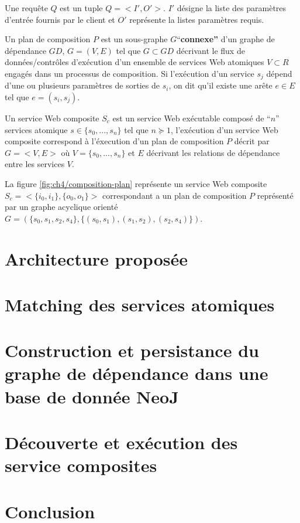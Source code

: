  \newpage
  \begin{mydef} Une requête $Q$ est un tuple $Q =
    <I', O'>$. $I'$ désigne la liste des paramètres d'entrée fournis
    par le client et $O'$ représente la listes paramètres requis.
  \end{mydef}

  \begin{mydef} Un plan de composition
    $P$ est un sous-graphe $G$``\textbf{connexe''} d'un graphe de
    dépendance $GD$, $G=(V,E)$ tel que $G \subset GD$ décrivant le
    flux de données/contrôles d'exécution d'un ensemble de services
    Web atomiques $V \subset R$ engagés dans un processus de
    composition. Si l'exécution d'un service $s_j$ dépend d'une ou
    plusieurs paramètres de sorties de $s_i$, on dit qu'il existe une
    arête $e \in E$ tel que $e = (s_i, s_j)$.
  \end{mydef}

  

  \begin{mydef} Un service Web
    composite $S_c$ est un service Web exécutable composé de ``$n$''
    services atomique $s \in \{s_0,..., s_n\}$ tel que $n \succeq 1$,
    l'exécution d'un service Web composite correspond à l'éxecution
    d'un plan de composition $P$ décrit par $G=<V,E>$ où $V = \{s_0,
    ..., s_n\}$ et $E$ décrivant les relations de dépendance entre les
    services $V$.
  \end{mydef}

  La figure \ref{fig:ch4/composition-plan} représente un service Web
  composite $S_c = <\{i_0, i_1\}, \{o_0, o_1\}>$ correspondant a un
  plan de composition $P$ représenté par un graphe acyclique orienté
  $G =(\{s_0, s_1, s_2, s_4\}, \{(s_0, s_1), (s_1, s_2), (s_2,
  s_4)\})$.

\section{Architecture proposée}
\label{sec:proposition}

\section{Matching des services  atomiques}
\section{Construction et persistance du graphe de dépendance dans une
  base de donnée NeoJ}
\section{Découverte et exécution des service composites}

\section*{Conclusion}
\label{sec:conclusion}
 


